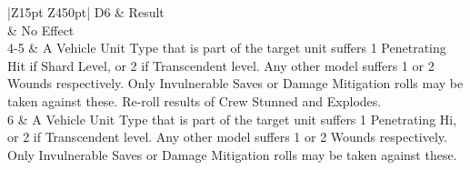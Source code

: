\begin{tabular}{|Z{15pt} Z{450pt}|}
	\hline
	D6 & Result \\
	 & No Effect \\
	4-5 &  A Vehicle Unit Type that is part of the target unit suffers 1 Penetrating Hit if Shard Level, or 2 if Transcendent level. Any other model suffers 1 or 2 Wounds respectively. Only Invulnerable Saves or Damage Mitigation rolls may be taken against these. Re-roll results of Crew Stunned and Explodes. \\
	6 &  A Vehicle Unit Type that is part of the target unit suffers 1 Penetrating Hi, or 2 if Transcendent level. Any other model suffers 1 or 2 Wounds respectively. Only Invulnerable Saves or Damage Mitigation rolls may be taken against these. \\
	\hline
\end{tabular}

